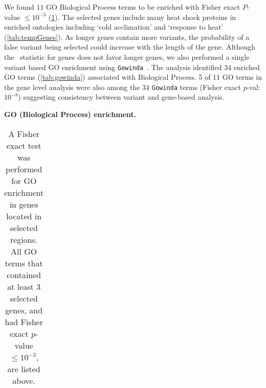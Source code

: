 We found $11$ GO Biological Process terms to be enriched with Fisher
exact $P$-value $\le 10^{-3}$ (\ref{tab:Fisher2}). The selected
genes include many heat shock proteins in enriched ontologies
including `cold acclimation' and `response to heat'
(\ref{tab:tempGenes}). As longer genes contain more variants,
the probability of a false variant being selected could increase with
the length of the gene. Although the \comale\ statistic for genes does
not favor longer genes, we also performed a single variant based GO
enrichment using \texttt{Gowinda}~\cite{kofler2012gowinda}. The
analysis identified 34 enriched GO terms
(\ref{tab:gowinda}) associated with Biological Process. 5
of 11 GO terms in the gene level analysis were also among the $34$
\texttt{Gowinda} terms (Fisher exact $p$-val: $10^{-8}$) suggesting
consistency between variant and gene-based analysis.

\begin{table}[H]
	\centering
		\caption{\bf GO (Biological Process) enrichment.}
	\begin{tabular}{c}
		
	\end{tabular}
	\caption*{ A Fisher exact test 
	was 
	performed for GO enrichment in genes located in selected regions. All GO 
	terms that contained at least $3$ selected genes, and had Fisher exact 
	$p$-value $\le 10^{-3}$, are listed above.}\label{tab:Fisher2}
\end{table}